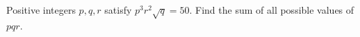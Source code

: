 Positive integers $p,q,r$ satisfy $p^3r^2\sqrt q=50$. Find the sum of all possible values of $pqr$.
